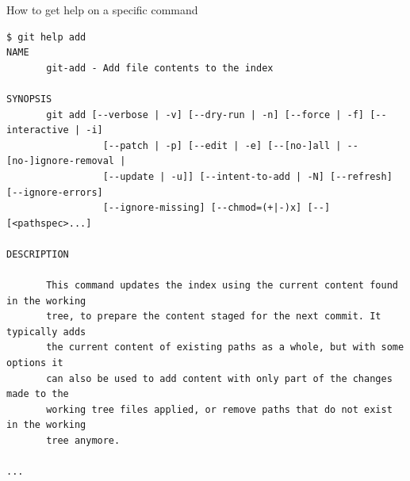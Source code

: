 \documentclass[svgnames]{beamer}
\begin{document}
\begin{frame}[fragile]{How to get help on a specific command}

 \addtolength\linewidth{0.5truecm}
 \begin{lstlisting}[basicstyle={\ttfamily\tiny}]
$ git help add
NAME
       git-add - Add file contents to the index

SYNOPSIS
       git add [--verbose | -v] [--dry-run | -n] [--force | -f] [--interactive | -i]
                 [--patch | -p] [--edit | -e] [--[no-]all | --[no-]ignore-removal |
                 [--update | -u]] [--intent-to-add | -N] [--refresh] [--ignore-errors]
                 [--ignore-missing] [--chmod=(+|-)x] [--] [<pathspec>...]

DESCRIPTION

       This command updates the index using the current content found in the working
       tree, to prepare the content staged for the next commit. It typically adds
       the current content of existing paths as a whole, but with some options it
       can also be used to add content with only part of the changes made to the
       working tree files applied, or remove paths that do not exist in the working
       tree anymore.

...
 \end{lstlisting}
\end{frame}
\end{document}
